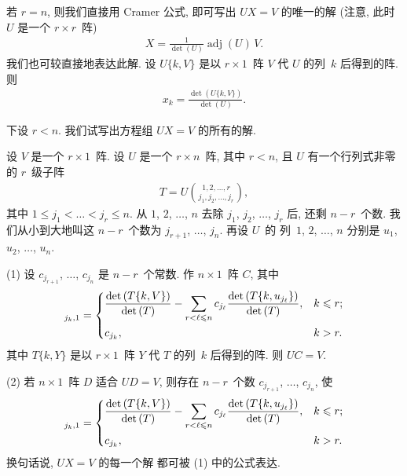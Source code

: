 若 \(r = n\),
则我们直接用 Cramer 公式,
即可写出 \(UX = V\) 的唯一的解
(注意, 此时 \(U\) 是一个 \(r \times r\)~阵)
\begin{align*}
    X = \frac{1}{\det {(U)}} \operatorname{adj} {(U)}\,V.
\end{align*}
我们也可较直接地表达此解.
设 \(U\{k,V\}\) 是以 \(r \times 1\)~阵 \(V\)
代 \(U\) 的列~\(k\) 后得到的阵.
则
\begin{align*}
    x_k = \frac{\det {(U\{k,V\})}}{\det {(U)}}.
\end{align*}

下设 \(r < n\).
我们试写出方程组 \(UX = V\) 的所有的解.

\begin{theorem}
    设 \(V\) 是一个 \(r \times 1\)~阵.
    设 \(U\) 是一个 \(r \times n\)~阵,
    其中 \(r < n\),
    且 \(U\) 有一个行列式非零的 \(r\)~级子阵
    \begin{align*}
        T = U\binom{1,2,\dots,r}{j_1,j_2,\dots,j_r},
    \end{align*}
    其中 \(1 \leq j_1 < \dots < j_r \leq n\).
    从 \(1\), \(2\), \(\dots\), \(n\)
    去除 \(j_1\), \(j_2\), \(\dots\), \(j_r\)
    后, 还剩 \(n - r\)~个数.
    我们从小到大地叫这 \(n - r\)~个数为
    \(j_{r+1}\), \(\dots\), \(j_n\).
    再设 \(U\)~的%
    列~\(1\), \(2\), \(\dots\), \(n\)
    分别是 \(u_1\), \(u_2\), \(\dots\), \(u_n\).

    (1)
    设 \(c_{j_{r+1}}\), \(\dots\), \(c_{j_n}\)
    是 \(n-r\)~个常数.
    作 \(n \times 1\)~阵 \(C\), 其中
    \begin{align*}
        [C]_{j_k,1}
        = \begin{dcases}
              \frac{\det {(T\{k,V\})}}{\det {(T)}}
              - \sum_{r < \ell \leq n}
              {c_{j_\ell}
              \frac{\det {(T\{k,u_{j_\ell}\})}}{\det {(T)}}},
               & k \leq r; \\
              c_{j_k},
               & k > r.
          \end{dcases}
    \end{align*}
    其中 \(T\{k,Y\}\) 是以 \(r \times 1\)~阵 \(Y\)
    代 \(T\) 的列~\(k\) 后得到的阵.
    则 \(UC = V\).

    (2)
    若 \(n \times 1\)~阵 \(D\) 适合 \(UD = V\),
    则存在 \(n-r\)~个数
    \(c_{j_{r+1}}\), \(\dots\), \(c_{j_n}\),
    使
    \begin{align*}
        [D]_{j_k,1}
        = \begin{dcases}
              \frac{\det {(T\{k,V\})}}{\det {(T)}}
              - \sum_{r < \ell \leq n}
              {c_{j_\ell}
              \frac{\det {(T\{k,u_{j_\ell}\})}}{\det {(T)}}},
               & k \leq r; \\
              c_{j_k},
               & k > r.
          \end{dcases}
    \end{align*}
    换句话说, \(UX = V\) 的每一个解%
    都可被 (1) 中的公式表达.
\end{theorem}


